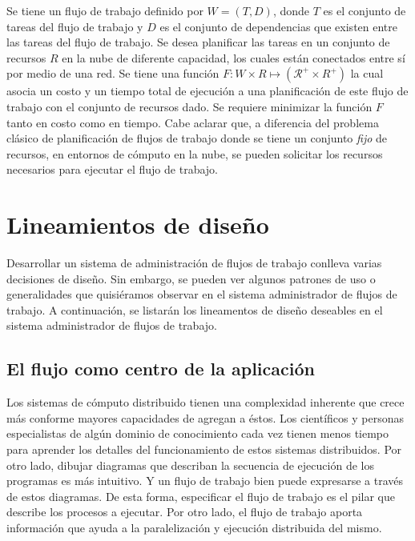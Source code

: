 Se tiene un flujo de trabajo definido por $W = (T, D)$, donde $T$ es el conjunto de tareas del flujo de trabajo y $D$ es el conjunto de dependencias que existen entre las tareas del flujo de trabajo. Se desea planificar las tareas en un conjunto de recursos $R$ en la nube de diferente capacidad, los cuales están conectados entre sí por medio de una red. Se tiene una función $F: W \times R \mapsto (\mathcal{R}^{+} \times {R}^{+}) $ la cual asocia un costo y un tiempo total de ejecución a una planificación de este flujo de trabajo con el conjunto de recursos dado. Se requiere minimizar la función $F$ tanto en costo como en tiempo. Cabe aclarar que, a diferencia del problema clásico de planificación de flujos de trabajo donde se tiene un conjunto \emph{fijo} de recursos, en entornos de c\'omputo en la nube, se pueden solicitar los recursos necesarios para ejecutar el flujo de trabajo.


\section{Lineamientos de diseño}

Desarrollar un sistema de administración de flujos de trabajo conlleva varias decisiones de diseño. Sin embargo, se pueden ver algunos patrones de uso o generalidades que quisiéramos observar en el sistema administrador de flujos de trabajo. A continuación, se listarán los lineamentos de diseño deseables en el sistema administrador de flujos de trabajo.



\subsection{El flujo como centro de la aplicación}

Los sistemas de cómputo distribuido tienen una complexidad inherente que crece más conforme mayores capacidades de agregan a éstos. Los científicos y personas especialistas de algún dominio de conocimiento cada vez tienen menos tiempo para aprender los detalles del funcionamiento de estos sistemas distribuidos. Por otro lado, dibujar diagramas que describan la secuencia de ejecución de los programas es más intuitivo. Y un flujo de trabajo bien puede expresarse a través de estos diagramas. De esta forma, especificar el flujo de trabajo es el pilar que describe los procesos a ejecutar. Por otro lado, el flujo de trabajo aporta información que ayuda a la paralelización y ejecución distribuida del mismo.



